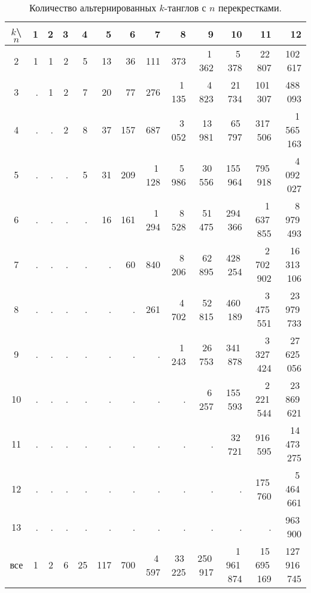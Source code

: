 		\begin{landscape}
		\begin{table}[ht]
			\caption{Количество альтернированных $k$-танглов с $n$ перекрестками.\label{table:alternating-tangles-table}}
			\centering
			\begin{tabular}{|c||r|r|r|r|r|r|r|r|r|r|r|r|}
			\hline
			$k$\textbackslash $n$
			    & 1 & 2 & 3 &  4 &   5 &   6 &      7 &       8 &        9 &          10 &           11 &            12 \\
			\hline\hline
			2   & 1 & 1 & 2 &  5 &  13 &  36 &    111 &     373 &   1\,362 &      5\,378 &      22\,807 &      102\,617 \\
			3   & . & 1 & 2 &  7 &  20 &  77 &    276 &  1\,135 &   4\,823 &     21\,734 &     101\,307 &      488\,093 \\
			4   & . & . & 2 &  8 &  37 & 157 &    687 &  3\,052 &  13\,981 &     65\,797 &     317\,506 &   1\,565\,163 \\
			5   & . & . & . &  5 &  31 & 209 & 1\,128 &  5\,986 &  30\,556 &    155\,964 &     795\,918 &   4\,092\,027 \\
			6   & . & . & . &  . &  16 & 161 & 1\,294 &  8\,528 &  51\,475 &    294\,366 &  1\,637\,855 &   8\,979\,493 \\
			7   & . & . & . &  . &   . &  60 &    840 &  8\,206 &  62\,895 &    428\,254 &  2\,702\,902 &  16\,313\,106 \\
			8   & . & . & . &  . &   . &   . &    261 &  4\,702 &  52\,815 &    460\,189 &  3\,475\,551 &  23\,979\,733 \\
			9   & . & . & . &  . &   . &   . &      . &  1\,243 &  26\,753 &    341\,878 &  3\,327\,424 &  27\,625\,056 \\
			10  & . & . & . &  . &   . &   . &      . &       . &   6\,257 &    155\,593 &  2\,221\,544 &  23\,869\,621 \\
			11  & . & . & . &  . &   . &   . &      . &       . &        . &     32\,721 &     916\,595 &  14\,473\,275 \\
			12  & . & . & . &  . &   . &   . &      . &       . &        . &           . &     175\,760 &   5\,464\,661 \\
			13  & . & . & . &  . &   . &   . &      . &       . &        . &           . &            . &      963\,900 \\
			\hline
			все & 1 & 2 & 6 & 25 & 117 & 700 & 4\,597 & 33\,225 & 250\,917 & 1\,961\,874 & 15\,695\,169 & 127\,916\,745 \\
			\hline
			\end{tabular}
		\end{table}
		\end{landscape}
